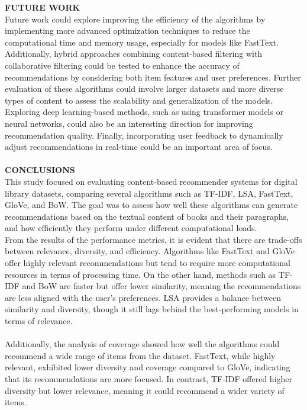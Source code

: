 \documentclass[10pt, oneside,english,hidelinks,a4paper]{article}
\begin{document}
\begin{multicols}{2}
\noindent
\textbf{FUTURE WORK}\\
Future work could explore improving the efficiency of the algorithms by implementing more advanced optimization techniques to reduce the computational time and memory usage, especially for models like FastText. Additionally, hybrid approaches combining content-based filtering with collaborative filtering could be tested to enhance the accuracy of recommendations by considering both item features and user preferences. Further evaluation of these algorithms could involve larger datasets and more diverse types of content to assess the scalability and generalization of the models. Exploring deep learning-based methods, such as using transformer models or neural networks, could also be an interesting direction for improving recommendation quality. Finally, incorporating user feedback to dynamically adjust recommendations in real-time could be an important area of focus.\\\\
%
\textbf{CONCLUSIONS}\\
This study focused on evaluating content-based recommender systems for digital library datasets, comparing several algorithms such as TF-IDF, LSA, FastText, GloVe, and BoW. The goal was to assess how well these algorithms can generate recommendations based on the textual content of books and their paragraphs, and how efficiently they perform under different computational loads.\\
From the results of the performance metrics, it is evident that there are trade-offs between relevance, diversity, and efficiency. Algorithms like FastText and GloVe offer highly relevant recommendations but tend to require more computational resources in terms of processing time. On the other hand, methods such as TF-IDF and BoW are faster but offer lower similarity, meaning the recommendations are less aligned with the user’s preferences. LSA provides a balance between similarity and diversity, though it still lags behind the best-performing models in terms of relevance.\\\\
Additionally, the analysis of coverage showed how well the algorithms could recommend a wide range of items from the dataset. FastText, while highly relevant, exhibited lower diversity and coverage compared to GloVe, indicating that its recommendations are more focused. In contrast, TF-IDF offered higher diversity but lower relevance, meaning it could recommend a wider variety of items.\\

\end{multicols}
\end{document}
